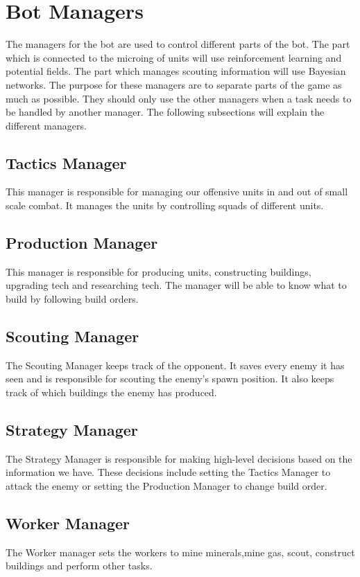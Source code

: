 \section{Bot Managers}
	\label{design::managers}
	The managers for the bot are used to control different parts of the bot. The part which is connected to the microing of units will use 
	reinforcement learning and potential fields. The part which manages scouting information will use Bayesian networks. 
	The purpose for these managers are to separate parts of the game as much as possible. They should only use the other managers when a task needs to be handled 
	by another manager. The following subsections will explain the different managers.
	
	\subsection*{Tactics Manager}
		This manager is responsible for managing our offensive units in and out of small scale combat. 
		It manages the units by controlling squads of different units.
	\subsection*{Production Manager}
		This manager is responsible for producing units, constructing buildings, upgrading tech and researching tech. The manager will be able to 
		know what to build by following build orders.
	\subsection*{Scouting Manager}
		The Scouting Manager keeps track of the opponent. 
		It saves every enemy it has seen and is responsible for scouting the enemy's spawn position. 
		It also keeps track of which buildings the enemy has produced.
	\subsection*{Strategy Manager}
		The Strategy Manager is responsible for making high-level decisions based on the information we have. These decisions include
		setting the Tactics Manager to attack the enemy or setting the Production Manager to change build order.
	\subsection*{Worker Manager}
		The Worker manager sets the workers to mine minerals,mine gas, scout, construct buildings and perform other tasks.
